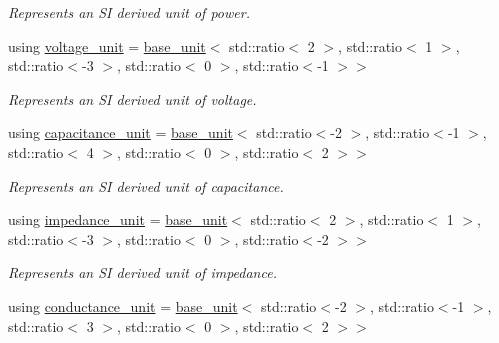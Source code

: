 \begin{DoxyCompactItemize}
\begin{DoxyCompactList}\small\item\em Represents an S\+I derived unit of power. \end{DoxyCompactList}\item 
\hypertarget{namespaceunits_1_1category_aaac5d18aab461c59602bf8f07861d26e}{}using \hyperlink{namespaceunits_1_1category_aaac5d18aab461c59602bf8f07861d26e}{voltage\+\_\+unit} = \hyperlink{structunits_1_1base__unit}{base\+\_\+unit}$<$ std\+::ratio$<$ 2 $>$, std\+::ratio$<$ 1 $>$, std\+::ratio$<$-\/3 $>$, std\+::ratio$<$ 0 $>$, std\+::ratio$<$-\/1 $>$$>$\label{namespaceunits_1_1category_aaac5d18aab461c59602bf8f07861d26e}

\begin{DoxyCompactList}\small\item\em Represents an S\+I derived unit of voltage. \end{DoxyCompactList}\item 
\hypertarget{namespaceunits_1_1category_a0485a4663b435d78582744b8b83ea3c2}{}using \hyperlink{namespaceunits_1_1category_a0485a4663b435d78582744b8b83ea3c2}{capacitance\+\_\+unit} = \hyperlink{structunits_1_1base__unit}{base\+\_\+unit}$<$ std\+::ratio$<$-\/2 $>$, std\+::ratio$<$-\/1 $>$, std\+::ratio$<$ 4 $>$, std\+::ratio$<$ 0 $>$, std\+::ratio$<$ 2 $>$$>$\label{namespaceunits_1_1category_a0485a4663b435d78582744b8b83ea3c2}

\begin{DoxyCompactList}\small\item\em Represents an S\+I derived unit of capacitance. \end{DoxyCompactList}\item 
\hypertarget{namespaceunits_1_1category_a0b9fe7547ad43633e885a8b3c8201840}{}using \hyperlink{namespaceunits_1_1category_a0b9fe7547ad43633e885a8b3c8201840}{impedance\+\_\+unit} = \hyperlink{structunits_1_1base__unit}{base\+\_\+unit}$<$ std\+::ratio$<$ 2 $>$, std\+::ratio$<$ 1 $>$, std\+::ratio$<$-\/3 $>$, std\+::ratio$<$ 0 $>$, std\+::ratio$<$-\/2 $>$$>$\label{namespaceunits_1_1category_a0b9fe7547ad43633e885a8b3c8201840}

\begin{DoxyCompactList}\small\item\em Represents an S\+I derived unit of impedance. \end{DoxyCompactList}\item 
\hypertarget{namespaceunits_1_1category_a15b4c4ec156dfa3f11f5123389182e4e}{}using \hyperlink{namespaceunits_1_1category_a15b4c4ec156dfa3f11f5123389182e4e}{conductance\+\_\+unit} = \hyperlink{structunits_1_1base__unit}{base\+\_\+unit}$<$ std\+::ratio$<$-\/2 $>$, std\+::ratio$<$-\/1 $>$, std\+::ratio$<$ 3 $>$, std\+::ratio$<$ 0 $>$, std\+::ratio$<$ 2 $>$$>$\label{namespaceunits_1_1category_a15b4c4ec156dfa3f11f5123389182e4e}


\end{DoxyCompactItemize}
